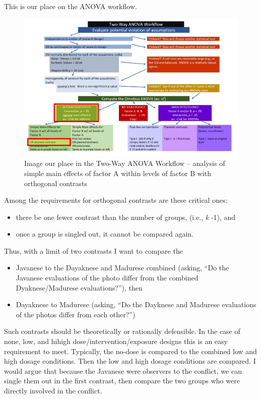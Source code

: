\documentclass[
  11pt,
]{book}
\providecommand{\tightlist}{%
  \setlength{\itemsep}{0pt}\setlength{\parskip}{0pt}}
\begin{document}
This is our place on the ANOVA workflow.

\begin{figure}
\centering
\includegraphics{images/factorial/WrkFlw_IntORTH.jpg}
\caption{Image our place in the Two-Way ANOVA Workflow -- analysis of simple main effects of factor A within levels of factor B with orthogonal contrasts}
\end{figure}

Among the requirements for orthogonal contrasts are these critical ones:

\begin{itemize}
\tightlist
\item
  there be one fewer contrast than the number of groups, (i.e., \emph{k} -1), and
\item
  once a group is singled out, it cannot be compared again.
\end{itemize}

Thus, with a limit of two contrasts I want to compare the

\begin{itemize}
\tightlist
\item
  Javanese to the Dayaknese and Madurese combined (asking, ``Do the Javanese evaluations of the photo differ from the combined Dyaknese/Madurese evaluations?''), then
\item
  Dayaknese to Madurese (asking, ``Do the Dayknese and Madurese evaluations of the photos differ from each other?'')
\end{itemize}

Such contrasts should be theoretically or rationally defensible. In the case of none, low, and hihigh dose/intervention/exposure designs this is an easy requirement to meet. Typically, the no-dose is compared to the combined low and high dosage conditions. Then the low and high dosage conditions are compared. I would argue that because the Javanese were observers to the conflict, we can single them out in the first contrast, then compare the two groups who were directly involved in the conflict.
\end{document}

